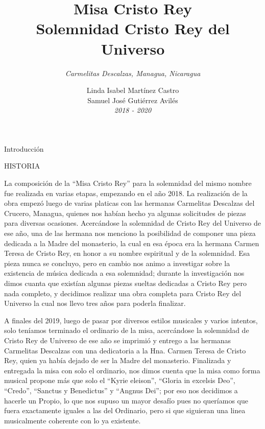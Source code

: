 \documentclass[12pt, letterpaper]{report}
\title{ \textbf{ \Huge Misa Cristo Rey  } \\ { \LARGE Solemnidad Cristo Rey del Universo } }
\author{ \textit{ \large Carmelitas Descalzas, Managua, Nicaragua } }
\date{ \LARGE Linda Isabel Mart\'inez Castro \\ Samuel Jos\'e Guti\'errez Avil\'es \\ \small \textit{2018 - 2020} }
\begin{document}
    \maketitle

    \begin{center}
        \vspace*{9cm}
        { \Huge Introducci\'on \par}
    \end{center}
    \clearpage
    
    \LARGE HISTORIA

    \Large La composici\'on de la ``Misa Cristo Rey'' para la solemnidad del mismo nombre fue realizada en varias etapas, empezando en el a\~no 2018. La realizaci\'on de la obra empez\'o luego de varias platicas con las hermanas Carmelitas Descalzas del Crucero, Managua, quienes nos hab\'ian hecho ya algunas solicitudes de piezas para diversas ocasiones. Acerc\'andose la solemnidad de Cristo Rey del Universo de ese a\~no, una de las hermana nos menciono la posibilidad de componer una pieza dedicada a la Madre del monasterio, la cual en esa \'epoca era la hermana Carmen Teresa de Cristo Rey, en honor a su nombre espiritual y de la solemnidad. Esa pieza nunca se concluyo, pero en cambio nos animo a investigar sobre la existencia de m\'usica dedicada a esa solemnidad; durante la investigaci\'on nos dimos cuanta que exist\'ian algunas piezas sueltas dedicadas a Cristo Rey pero nada completo, y decidimos realizar una obra completa para Cristo Rey del Universo la cual nos llevo tres a\~nos para poderla finalizar.

    A finales del 2019, luego de pasar por diversos estilos musicales y varios intentos, solo ten\'iamos terminado el ordinario de la misa, acerc\'andose la solemnidad de Cristo Rey de Universo de ese a\~no se imprimi\'o y entrego a las hermanas Carmelitas Descalzas con una dedicatoria a la Hna. Carmen Teresa de Cristo Rey, quien ya hab\'ia dejado de ser la Madre del monasterio. Finalizada y entregada la misa con solo el ordinario, nos dimos cuenta que la misa como forma musical propone m\'as que solo el ``Kyrie eleison'', ``Gloria in excelsis Deo'', ``Credo'', ``Sanctus y Benedictus'' y ``Angnus Dei''; por eso nos decidimos a hacerle un Propio, lo que nos supuso un mayor desaf\'io pues no quer\'iamos que fuera exactamente iguales a las del Ordinario, pero si que siguieran una linea musicalmente coherente con lo ya existente.
\end{document}
